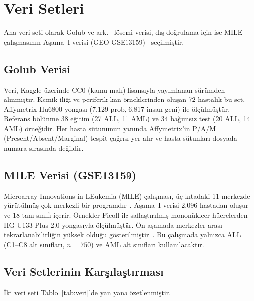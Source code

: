 \documentclass[conference]{IEEEtran}
\begin{document}
\section{Veri Setleri}
Ana veri seti olarak Golub ve ark.~\cite{golub1999} lösemi verisi, dış doğrulama için ise MILE çalışmasının Aşama~I verisi (GEO GSE13159)~\cite{haferlach2010} seçilmiştir.

\subsection{Golub Verisi}
Veri, Kaggle üzerinde CC0 (kamu malı) lisansıyla yayımlanan sürümden alınmıştır. Kemik iliği ve periferik kan örneklerinden oluşan 72 hastalık bu set, Affymetrix Hu6800 yongası (7.129 prob, 6.817 insan geni) ile ölçülmüştür. Referans bölünme 38 eğitim (27 ALL, 11 AML) ve 34 bağımsız test (20 ALL, 14 AML) örneğidir. Her hasta sütununun yanında Affymetrix'in P/A/M (Present/Absent/Marginal) tespit çağrısı yer alır ve hasta sütunları dosyada numara sırasında değildir.

\subsection{MILE Verisi (GSE13159)}
Microarray Innovations in LEukemia (MILE) çalışması, üç kıtadaki 11 merkezde yürütülmüş çok merkezli bir programdır~\cite{haferlach2010}. Aşama~I verisi 2.096 hastadan oluşur ve 18 tanı sınıfı içerir. Örnekler Ficoll ile saflaştırılmış mononükleer hücrelerden HG-U133 Plus 2.0 yongasıyla ölçülmüştür. Ön aşamada merkezler arası tekrarlanabilirliğin yüksek olduğu gösterilmiştir~\cite{kohlmann2008}. Bu çalışmada yalnızca ALL (C1--C8 alt sınıfları, $n=750$) ve AML alt sınıfları kullanılacaktır.

\subsection{Veri Setlerinin Karşılaştırması}
İki veri seti Tablo~\ref{tab:veri}'de yan yana özetlenmiştir.
\end{document}
